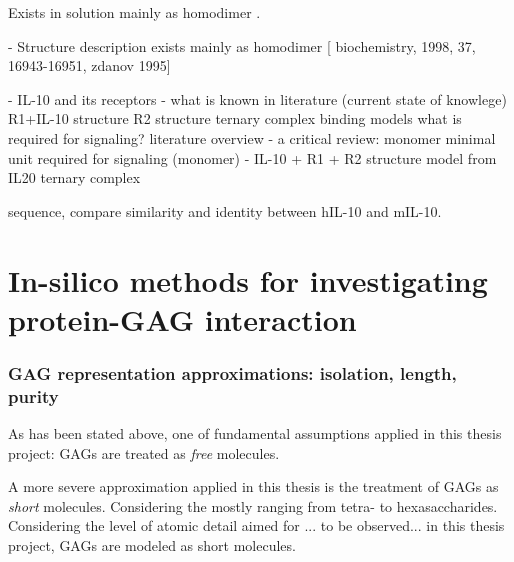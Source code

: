 Exists in solution mainly as homodimer \cite{syto_il10_homodimer_1998}.


    - Structure description
        exists mainly as homodimer [
            biochemistry, 1998, 37, 16943-16951, zdanov 1995]


    - IL-10 and its receptors
        - what is known in literature (current state of knowlege)
            R1+IL-10 structure
            R2 structure
            ternary complex binding models
            what is required for signaling? literature overview
        - a critical review: monomer
            minimal unit required for signaling (monomer)
        - IL-10 + R1 + R2 structure model from IL20 ternary complex

sequence, compare similarity and identity between hIL-10 and mIL-10.


\section{In-silico methods for investigating protein-GAG interaction}


\subsubsection{GAG representation approximations: isolation, length, purity}

As has been stated above, one of fundamental assumptions applied in this thesis
project: GAGs are treated as \textit{free} molecules.


A more severe approximation applied in this thesis is the treatment of GAGs as
\textit{short} molecules. Considering the  mostly ranging from tetra- to hexasaccharides. Considering the level of atomic detail aimed for ... to be observed... in this
thesis project, GAGs are modeled as short molecules.


